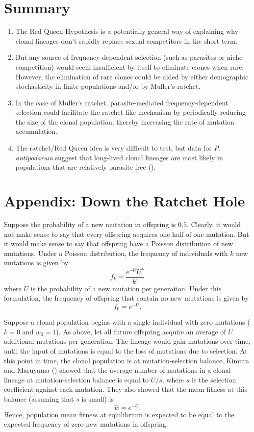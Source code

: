 \documentclass[
  letterpaper,
]{book}
\begin{document}
\section{Summary}\label{summary-4}

\begin{enumerate}
\def\labelenumi{\arabic{enumi}.}
\item
  The Red Queen Hypothesis is a potentially general way of explaining
  why clonal lineages don't rapidly replace sexual competitors in the
  short term.
\item
  But any source of frequency-dependent selection (such as parasites or
  niche competition) would seem insufficient by itself to eliminate
  clones when rare. However, the elimination of rare clones could be
  aided by either demographic stochasticity in finite populations and/or
  by Muller's ratchet.
\item
  In the case of Muller's ratchet, parasite-mediated frequency-dependent
  selection could facilitate the ratchet-like mechanism by periodically
  reducing the size of the clonal population, thereby increasing the
  rate of mutation accumulation.
\item
  The ratchet/Red Queen idea is very difficult to test, but data for
  \emph{P. antipodarum} suggest that long-lived clonal lineages are most
  likely in populations that are relatively parasite free
  ().
\end{enumerate}

\section{Appendix: Down the Ratchet Hole}\label{sec-app-6}

Suppose the probability of a new mutation in offspring is \(0.5\).
Clearly, it would not make sense to say that every offspring acquires
one half of one mutation. But it would make sense to say that offspring
have a Poisson distribution of new mutations. Under a Poisson
distribution, the frequency of individuals with \(k\) new mutations is
given by \[f_k=\frac{e^{-U}U^k}{k!}\] where \(U\) is the probability of
a new mutation per generation. Under this formulation, the frequency of
offspring that contain no new mutations is given by \[f_0=e^{-U}.\]

Suppose a clonal population begins with a single individual with zero
mutations (\(k = 0\) and \(w_0 = 1\)). As above, let all future
offspring acquire an average of \(U\) additional mutations per
generation. The lineage would gain mutations over time, until the input
of mutations is equal to the loss of mutations due to selection. At this
point in time, the clonal population is at mutation-selection balance.
Kimura and Maruyama () showed that the
average number of mutations in a clonal lineage at mutation-selection
balance is equal to \(U/s\), where \(s\) is the selection coefficient
against each mutation. They also showed that the mean fitness at this
balance (assuming that \(s\) is small) is \[\hat{w}=e^{-U}.\] Hence,
population mean fitness at equilibrium is expected to be equal to the
expected frequency of zero new mutations in offspring.
\end{document}
